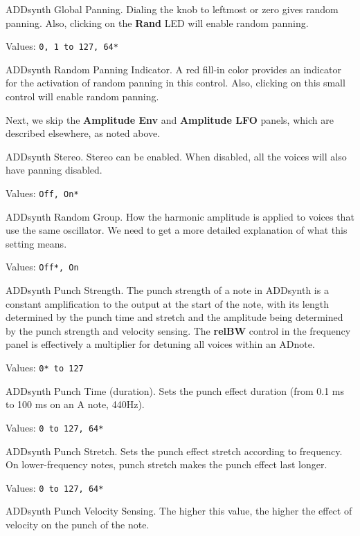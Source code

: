    ADDsynth Global Panning.
   Dialing the knob to leftmost or zero gives random panning.
   Also, clicking on the \textbf{Rand} LED will enable random panning.

   Values: \texttt{0, 1 to 127, 64*}

   ADDsynth Random Panning Indicator.
   A red fill-in color provides an indicator for the activation of random
   panning in this control.
   Also, clicking on this small control will enable random panning.

   Next, we skip the \textbf{Amplitude Env} and \textbf{Amplitude LFO}
   panels, which are described elsewhere, as noted above.

   ADDsynth Stereo.
   Stereo can be enabled.
   When disabled, all the voices will also have panning disabled.

   Values: \texttt{Off, On*}

   ADDsynth Random Group.
   How the harmonic amplitude is applied to voices that use the same
   oscillator.
   We need to get a more detailed explanation of what this setting means.

   Values: \texttt{Off*, On}

   ADDsynth Punch Strength.
   The punch strength of a note in ADDsynth is a constant amplification to
   the output at the start of the note, with its length determined by the
   punch time and stretch and the amplitude being determined by the punch
   strength and velocity sensing. The \textbf{relBW}
   control in the frequency panel is
   effectively a multiplier for detuning all voices within an ADnote.

   Values: \texttt{0* to 127}

   ADDsynth Punch Time (duration).
   Sets the punch effect duration (from 0.1 ms to 100 ms on an A note, 440Hz).

   Values: \texttt{0 to 127, 64*}

   ADDsynth Punch Stretch.
   Sets the punch effect stretch according to frequency. On lower-frequency
   notes, punch stretch makes the punch effect last longer.

   Values: \texttt{0 to 127, 64*}

   ADDsynth Punch Velocity Sensing.
   The higher this value, the higher the effect of velocity on the punch of
   the note.

